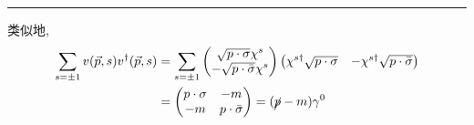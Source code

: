 \begin{itemize}
\begin{tcolorbox}[title=calculation:]
		\noindent\rule[0.5ex]{\linewidth}{0.5pt} %
		
		类似地,
		\begin{align}
			\sum_{s = \pm 1} v(\vec{p}, s) v^\dag(\vec{p}, s) &= \sum_{s = \pm 1} \begin{pmatrix}
				\sqrt{p \cdot \sigma} \chi^s \\
				- \sqrt{p \cdot \bar{\sigma}} \chi^s
			\end{pmatrix} \begin{pmatrix}
				\chi^{s \dag} \sqrt{p \cdot \sigma} & - \chi^{s \dag} \sqrt{p \cdot \bar{\sigma}}
			\end{pmatrix} \notag \\
			&= \begin{pmatrix}
				p \cdot \sigma & - m \\
				- m & p \cdot \bar{\sigma}
			\end{pmatrix} = (\cancel{p} - m) \gamma^0
		\end{align}
	\end{tcolorbox}
\end{itemize}

